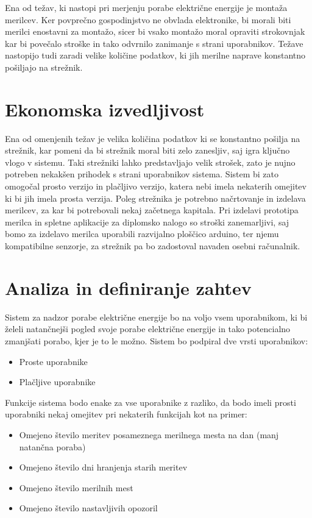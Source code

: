 \documentclass[12pt,a4paper,titlepage,openany]{report}
\begin{document}
Ena od težav, ki nastopi pri merjenju porabe električne energije je montaža merilcev. Ker povprečno gospodinjstvo ne obvlada elektronike, bi morali biti merilci enostavni za montažo, sicer bi vsako montažo moral opraviti strokovnjak kar bi povečalo stroške in tako odvrnilo zanimanje s strani uporabnikov. Težave nastopijo tudi zaradi velike količine podatkov, ki jih merilne naprave konstantno pošiljajo na strežnik. 

\chapter{Ekonomska izvedljivost}
\thispagestyle{fancy}

Ena od omenjenih težav je velika količina podatkov ki se konstantno pošilja na strežnik, kar pomeni da bi strežnik moral biti zelo zanesljiv, saj igra ključno vlogo v sistemu. Taki strežniki lahko predstavljajo velik strošek, zato je nujno potreben nekakšen prihodek s strani uporabnikov sistema. Sistem bi zato omogočal prosto verzijo in plačljivo verzijo, katera nebi imela nekaterih omejitev ki bi jih imela prosta verzija. 
Poleg strežnika je potrebno načrtovanje in izdelava merilcev, za kar bi potrebovali nekaj začetnega kapitala. 
Pri izdelavi prototipa merilca in spletne aplikacije za diplomsko nalogo so stroški zanemarljivi, saj bomo za izdelavo merilca uporabili razvijalno ploščico arduino, ter njemu kompatibilne senzorje, za strežnik pa bo zadostoval navaden osebni računalnik.

\chapter{Analiza in definiranje zahtev}
\thispagestyle{fancy}

Sistem za nadzor porabe električne energije bo na voljo vsem uporabnikom, ki bi želeli natančnejši pogled svoje porabe električne energije in tako potencialno zmanjšati porabo, kjer je to le možno. Sistem bo podpiral dve vrsti uporabnikov:
\begin{itemize}
\item Proste uporabnike
\item Plačljive uporabnike
\end{itemize}
Funkcije sistema bodo enake za vse uporabnike z razliko, da bodo imeli prosti uporabniki nekaj omejitev pri nekaterih funkcijah kot na primer:
\begin{itemize}
\item Omejeno število meritev posameznega merilnega mesta na dan (manj natančna poraba)
\item Omejeno število dni hranjenja starih meritev
\item Omejeno število merilnih mest
\item Omejeno število nastavljivih opozoril
\end{itemize}
\end{document}
